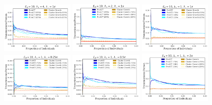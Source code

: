 \documentclass[a4paper,11pt]{article}
\begin{document}
\clearpage

\begin{figure}[!h]
\centering
\includegraphics[width=0.32\textwidth]{figs/results_efficacy_individual_SAMPLE-FIRSTART_ARTRATE-4.pdf}
\includegraphics[width=0.32\textwidth]{figs/results_efficacy_individual_SAMPLE-FIRSTART_ARTRATE-2.pdf}
\includegraphics[width=0.32\textwidth]{figs/results_efficacy_individual_SAMPLE-FIRSTART_ARTRATE-1.pdf}\\
\includegraphics[width=0.32\textwidth]{figs/results_efficacy_individual_SAMPLE-FIRSTART_STOPRATE-0.25x.pdf}
\includegraphics[width=0.32\textwidth]{figs/results_efficacy_individual_SAMPLE-FIRSTART_STOPRATE-0.5x.pdf}
\includegraphics[width=0.32\textwidth]{figs/results_efficacy_individual_SAMPLE-FIRSTART_STOPRATE-2x.pdf}\\

\end{figure}
\end{document}
